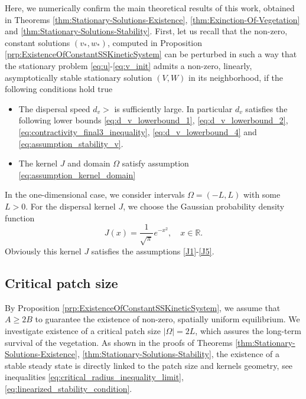 \documentclass[11pt, a4paper]{article}
\theoremstyle{break}
\theoremstyle{break}
\theoremstyle{break}
\theoremstyle{break}
\theoremstyle{break}
\theoremstyle{break}
\theoremstyle{break}
\begin{document}
Here, we numerically confirm the main theoretical results of this work, obtained in Theorems \ref{thm:Stationary-Solutions-Existence}, \ref{thm:Exinction-Of-Vegetation} and \ref{thm:Stationary-Solutions-Stability}. First, let us recall that the non-zero, constant solutions $(v_*, w_*)$, computed in Proposition \ref{prp:ExistenceOfConstantSSKineticSystem} can be perturbed in such a way that the stationary problem \eqref{eq:u}-\eqref{eq:v_init} admits a non-zero, linearly, asymptotically stable stationary solution $(V, W)$ in its neighborhood, if the following conditions hold true
\begin{itemize}
    \item[(A1)] The dispersal speed $d_v >$ is sufficiently large. In particular $d_v$ satisfies the following lower bounds \eqref{eq:d_v_lowerbound_1}, \eqref{eq:d_v_lowerbound_2}, \eqref{eq:contractivity_final3_inequality}, \eqref{eq:d_v_lowerbound_4} and \eqref{eq:assumption_stability_v}.
    \item[(A2)] The kernel $J$ and domain $\Omega$ satisfy assumption \eqref{eq:assumption_kernel_domain}
\end{itemize}
In the one-dimensional case, we consider intervals $\Omega = (-L, L)$ with some $L > 0$. For the dispersal kernel $J$, we choose the Gaussian probability density function
\begin{equation}
    \label{eq:1dGaussian_PDF}
    J(x) = \frac{1}{\sqrt{\pi}}e^{-x^2}, \quad x \in \mathbb{R}.
\end{equation}
Obviously this kernel $J$ satisfies the assumptions \ref{J1}-\ref{J5}.

\subsection{Critical patch size}

By Proposition \ref{prp:ExistenceOfConstantSSKineticSystem}, we assume that $A \geq 2B$ to guarantee the existence of non-zero, spatially uniform equilibrium. We investigate existence of a critical patch size $|\Omega| = 2L$, which assures the long-term survival of the vegetation. As shown in the proofs of Theorems \ref{thm:Stationary-Solutions-Existence}, \ref{thm:Stationary-Solutions-Stability}, the existence of a stable steady state is directly linked to the patch size and kernels geometry, see inequalities \eqref{eq:critical_radius_inequality_limit}, \eqref{eq:linearized_stability_condition}.
\end{document}
